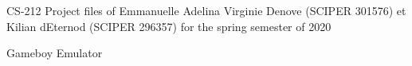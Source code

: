 C\+S-\/212 Project files of Emmanuelle Adelina Virginie Denove (S\+C\+I\+P\+ER 301576) et Kilian d\textquotesingle{}Eternod (S\+C\+I\+P\+ER 296357) for the spring semester of 2020

Gameboy Emulator 